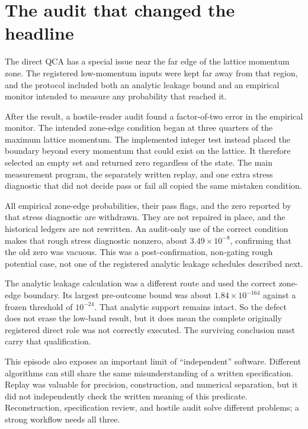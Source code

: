 \documentclass[11pt]{article}
\begin{document}
\section{The audit that changed the headline}

The direct QCA has a special issue near the far edge of the lattice momentum
zone.  The registered low-momentum inputs were kept far away from that region,
and the protocol included both an analytic leakage bound and an empirical
monitor intended to measure any probability that reached it.

After the result, a hostile-reader audit found a factor-of-two error in the
empirical monitor.  The intended zone-edge condition began at three quarters
of the maximum lattice momentum.  The implemented integer test instead placed
the boundary beyond every momentum that could exist on the lattice.  It
therefore selected an empty set and returned zero regardless of the state.
The main measurement program, the separately written replay, and one extra
stress diagnostic that did not decide pass or fail all copied the same mistaken
condition.

All empirical zone-edge probabilities, their pass flags, and the zero reported
by that stress diagnostic are withdrawn.  They are not repaired in place, and the historical
ledgers are not rewritten.  An audit-only use of the correct condition makes
that rough stress diagnostic nonzero, about $3.49\times10^{-8}$, confirming
that the old zero was vacuous.  This was a post-confirmation, non-gating rough
potential case, not one of the registered analytic leakage schedules described
next.

The analytic leakage calculation was a different route and used the correct
zone-edge boundary.  Its largest pre-outcome bound was about
$1.84\times10^{-164}$ against a frozen threshold of $10^{-24}$.  That analytic
support remains intact.  So the defect does not erase the low-band result, but
it does mean the complete originally registered direct role was not correctly
executed.  The surviving conclusion must carry that qualification.

This episode also exposes an important limit of ``independent'' software.
Different algorithms can still share the same misunderstanding of a written
specification.  Replay was valuable for precision, construction, and numerical
separation, but it did not independently check the written meaning of this
predicate.  Reconstruction, specification review, and hostile audit solve
different problems; a strong workflow needs all three.
\end{document}
